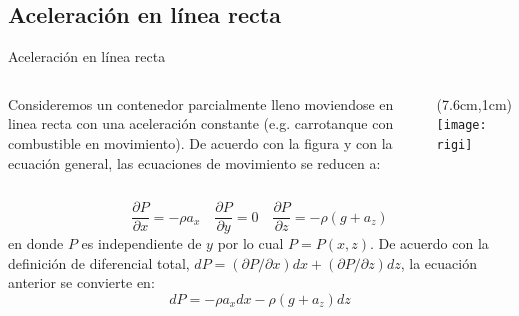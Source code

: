 \documentclass [xcolor=svgnames, t] {beamer}
\begin{document}
%

\subsection{Aceleraci\'on en l\'inea recta}
\begin{frame}{Aceleraci\'on en l\'inea recta}
\begin{columns}
Consideremos un contenedor parcialmente lleno moviendose en linea recta con una aceleraci\'on constante (e.g. carrotanque con combustible en movimiento). De acuerdo con la figura y con la ecuaci\'on general, las ecuaciones de  movimiento se reducen a:
\begin{textblock*}{4cm}(7.6cm,1cm) %
\texttt{[image: rigi]}
\end{textblock*}
\end{columns}
\vspace{0.5cm}
$$
\frac{\partial P}{\partial x}=-\rho a_x \quad \frac{\partial P}{\partial y} = 0 \quad \frac{\partial P}{\partial z}=-\rho(g+ a_z)
$$
en donde $P$ es independiente de $y$ por lo cual $P=P(x,z)$. De acuerdo con la definici\'on de diferencial total, $dP = (\partial P / \partial x)dx + (\partial P / \partial z)dz$, la ecuaci\'on anterior se convierte en:
$$
dP = -\rho a_x dx - \rho(g + a_z)dz
$$
\end{frame}
\end{document}
